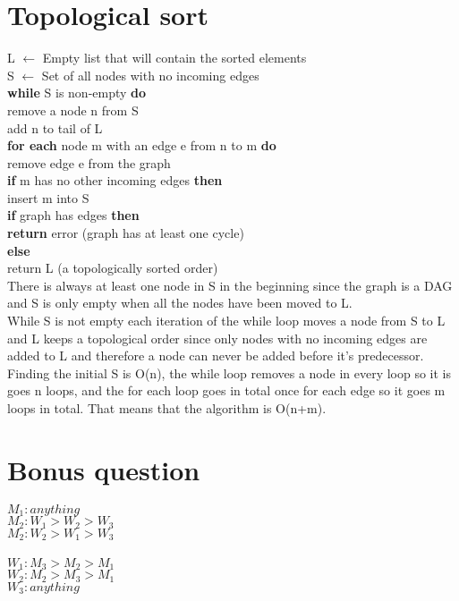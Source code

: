 \documentclass[a4paper]{article}
\begin{document}
\section{Topological sort}
L $\leftarrow$ Empty list that will contain the sorted elements\\
S $\leftarrow$ Set of all nodes with no incoming edges\\
\textbf{while} S is non-empty \textbf{do}\\
\indent remove a node n from S\\
\indent add n to tail of L\\
\indent \textbf{for each }node m with an edge e from n to m \textbf{do}\\
\indent \indent remove edge e from the graph\\
\indent \indent \textbf{if} m has no other incoming edges \textbf{then}\\
\indent \indent \indent insert m into S\\
\textbf{if} graph has edges \textbf{then}\\
\indent \textbf{return} error (graph has at least one cycle)\\
\textbf{else} \\
\indent return L (a topologically sorted order)\\

There is always at least one node in S in the beginning since the graph is a DAG and
S is only empty when all the nodes have been moved to L. \\
While S is not empty each iteration of the while loop moves a node from S to L and L keeps a topological order since only nodes with no incoming edges are added to L and therefore a node can never be added before it's predecessor.\\
Finding the initial S is O(n), the while loop removes a node in every loop so it is goes n loops, and the for each loop goes in total once for each edge so it goes m loops in total. That means that the algorithm is O(n+m).


\section{Bonus question}

$M_1: anything $ \\
$M_2: W_1 > W_2 > W_3$\\
$M_2: W_2 > W_1 > W_3$\\\\
$W_1: M_3 > M_2 > M_1$\\
$W_2: M_2 > M_3 > M_1$\\
$W_3: anything$\\
\end{document}

